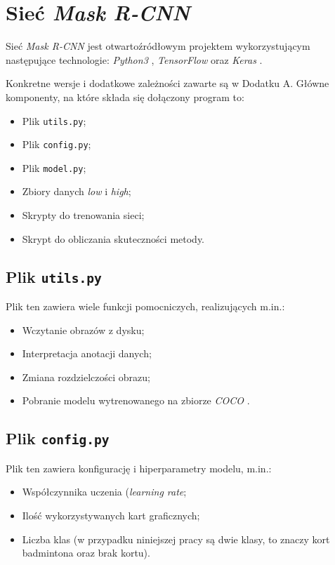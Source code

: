 \newpage
\section{Sieć \textit{Mask R-CNN}}

Sieć \textit{Mask R-CNN} \cite{matterport-mask-rcnn} jest otwartoźródłowym projektem wykorzystującym następujące technologie: \textit{Python3} \cite{python}, \textit{TensorFlow} \cite{tensorflow} oraz \textit{Keras} \cite{keras}.

Konkretne wersje i dodatkowe zależności zawarte są w Dodatku A. Główne komponenty, na które składa się dołączony program to:

\begin{itemize}
\item Plik \texttt{utils.py};
  \item Plik \texttt{config.py};
  \item Plik  \texttt{model.py};
  \item Zbiory danych \textit{low} i \textit{high};
  \item Skrypty do trenowania sieci;
  \item Skrypt do obliczania skuteczności metody.
\end{itemize}

\subsection*{Plik \texttt{utils.py}}

Plik ten zawiera wiele funkcji pomocniczych, realizujących m.in.:
\begin{itemize}
  \item Wczytanie obrazów z dysku;
  \item Interpretacja anotacji danych;
  \item Zmiana rozdzielczości obrazu;
  \item Pobranie modelu wytrenowanego na zbiorze \textit{COCO} \cite{coco}.
\end{itemize}

\subsection*{Plik \texttt{config.py}}

Plik ten zawiera konfigurację i hiperparametry modelu, m.in.:
\begin{itemize}
  \item Współczynnika uczenia (\textit{learning rate};
  \item Ilość wykorzystywanych kart graficznych;
  \item Liczba klas (w przypadku niniejszej pracy są dwie klasy, to znaczy kort badmintona oraz brak kortu).
\end{itemize}

